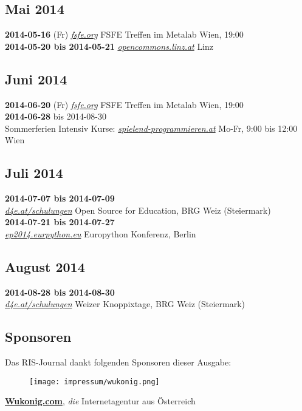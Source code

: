 \subsection*{Mai 2014}
\textbf{2014-05-16} (Fr) \href{http://fsfe.org}{\textit{fsfe.org}} FSFE Treffen im Metalab Wien, 19:00\\
\textbf{2014-05-20 bis 2014-05-21} \href{http://www.opencommons.linz.at/}{\textit{opencommons.linz.at}} Linz\\
\subsection*{Juni 2014}
\textbf{2014-06-20} (Fr) \href{http://fsfe.org}{\textit{fsfe.org}} FSFE Treffen im Metalab Wien, 19:00\\
\textbf{2014-06-28} bis 2014-08-30\\ Sommerferien Intensiv Kurse: \href{http://spielend-programmieren.at}{\textit{spielend-programmieren.at}} Mo-Fr, 9:00 bis 12:00 Wien\\
\subsection*{Juli 2014}
\textbf{2014-07-07 bis 2014-07-09}\\ \href{http://d4e.at/schulungen/}{\textit{d4e.at/schulungen}} Open Source for Education, BRG Weiz (Steiermark)\\
\textbf{2014-07-21 bis 2014-07-27}\\ \href{https://ep2014.europython.eu/en/}{\textit{ep2014.eurpython.eu}} Europython Konferenz, Berlin\\
\subsection*{August 2014}
\textbf{2014-08-28 bis 2014-08-30}\\ \href{http://d4e.at/schulungen/}{\textit{d4e.at/schulungen}} Weizer Knoppixtage, BRG Weiz (Steiermark)\\
\subsection*{Sponsoren}
Das RIS-Journal dankt folgenden Sponsoren dieser Ausgabe:
\begin{figure}
\texttt{[image: impressum/wukonig.png]}
\end{figure}
\href{http://wukonig.com}{\textbf{Wukonig.com}}, \textit{die} Internetagentur aus Österreich
